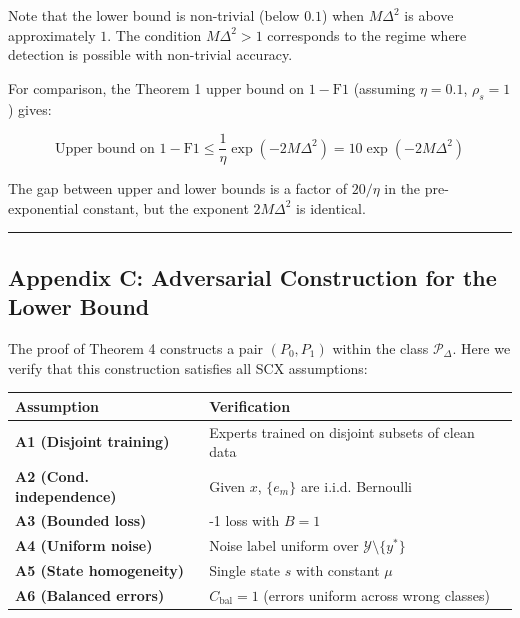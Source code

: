 \documentclass[
  12pt,
]{ctexart}
\begin{document}
Note that the lower bound is non-trivial (below \(0.1\)) when
\(M\Delta^2\) is above approximately \(1\). The condition
\(M\Delta^2 > 1\) corresponds to the regime where detection is possible
with non-trivial accuracy.

For comparison, the Theorem 1 upper bound on \(1-\text{F1}\) (assuming
\(\eta=0.1\), \(\rho_s=1\)) gives:

\[\text{Upper bound on } 1-\text{F1} \leq \frac{1}{\eta}\exp(-2M\Delta^2) = 10\exp(-2M\Delta^2)\]

The gap between upper and lower bounds is a factor of \(20/\eta\) in the
pre-exponential constant, but the exponent \(2M\Delta^2\) is identical.

\begin{center}\rule{0.5\linewidth}{0.5pt}\end{center}

\subsection{Appendix C: Adversarial Construction for the Lower
Bound}\label{appendix-c-adversarial-construction-for-the-lower-bound}

The proof of Theorem 4 constructs a pair \((P_0, P_1)\) within the class
\(\mathcal{P}_\Delta\). Here we verify that this construction satisfies
all SCX assumptions:

\begin{longtable}[]{@{}
  >{\raggedright\arraybackslash}p{}
  >{\raggedright\arraybackslash}p{}@{}}
\toprule\noalign{}
\begin{minipage}[b]{\linewidth}\raggedright
Assumption
\end{minipage} & \begin{minipage}[b]{\linewidth}\raggedright
Verification
\end{minipage} \\
\midrule\noalign{}
\endhead
\bottomrule\noalign{}
\endlastfoot
\textbf{A1 (Disjoint training)} & Experts trained on disjoint subsets of
clean data \\
\textbf{A2 (Cond. independence)} & Given \(x\), \(\{e_m\}\) are i.i.d.
Bernoulli \\
\textbf{A3 (Bounded loss)} & 0-1 loss with \(B=1\) \\
\textbf{A4 (Uniform noise)} & Noise label uniform over
\(\mathcal{Y}\setminus\{y^*\}\) \\
\textbf{A5 (State homogeneity)} & Single state \(s\) with constant
\(\mu\) \\
\textbf{A6 (Balanced errors)} & \(C_{\text{bal}} = 1\) (errors uniform
across wrong classes) \\
\end{longtable}
\end{document}
